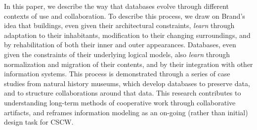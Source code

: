 In this paper, we describe the way that databases evolve through different contexts of use and collaboration. To describe this process, we draw on Brand's idea that buildings, even given their architectural constraints, \emph{learn} through adaptation to their inhabitants, modification to their changing surroundings, and by rehabilitation of both their inner and outer appearances. Databases, even given the constraints of their underlying logical models, also \emph{learn} through normalization and migration of their contents, and by their integration with other information systems. This process is demonstrated through a series of case studies from natural history museums, which develop databases to preserve data, and to structure collaborations around that data. This research contributes to understanding long-term methods of cooperative work through collaborative artifacts, and reframes information modeling as an on-going (rather than initial) design task for CSCW.